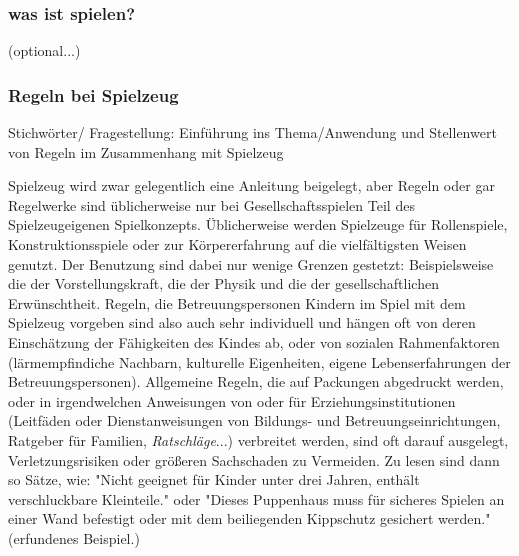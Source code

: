 \documentclass[11pt,a4paper,twoside]{scrreprt}
\begin{document}
		\subsubsection{was ist spielen?}
				(optional...)

		\subsubsection{Regeln bei Spielzeug}
Stichwörter/ Fragestellung: Einführung ins Thema/Anwendung und Stellenwert von Regeln im Zusammenhang mit Spielzeug

Spielzeug wird zwar gelegentlich eine Anleitung beigelegt, aber Regeln oder gar Regelwerke sind üblicherweise nur bei Gesellschaftsspielen Teil des Spielzeugeigenen Spielkonzepts. 
Üblicherweise werden Spielzeuge für Rollenspiele, Konstruktionsspiele oder zur Körpererfahrung auf die vielfältigsten Weisen genutzt. Der Benutzung sind dabei nur wenige Grenzen gestetzt: Beispielsweise die der Vorstellungskraft, die der Physik und die der gesellschaftlichen Erwünschtheit. Regeln, die Betreuungspersonen Kindern im Spiel mit dem Spielzeug vorgeben sind also auch sehr individuell und hängen oft von deren Einschätzung der Fähigkeiten des Kindes ab, oder von sozialen Rahmenfaktoren (lärmempfindiche Nachbarn, kulturelle Eigenheiten, eigene Lebenserfahrungen der Betreuungspersonen).  Allgemeine Regeln, die auf Packungen abgedruckt werden, oder in irgendwelchen Anweisungen von oder für Erziehungsinstitutionen (Leitfäden oder Dienstanweisungen von Bildungs- und Betreuungseinrichtungen, Ratgeber für Familien, \textit{Ratschläge}...) verbreitet werden, sind oft darauf ausgelegt, Verletzungsrisiken oder größeren Sachschaden zu Vermeiden. 
Zu lesen sind dann so Sätze, wie: "Nicht geeignet für Kinder unter drei Jahren, enthält verschluckbare Kleinteile." oder "Dieses Puppenhaus muss für sicheres Spielen an einer Wand befestigt oder mit dem beiliegenden Kippschutz gesichert werden." (erfundenes Beispiel.) 
\end{document}
